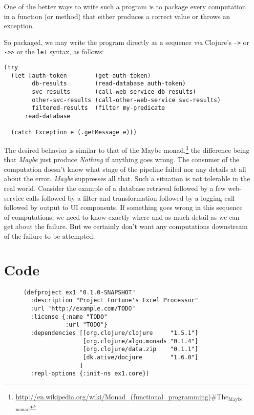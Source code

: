 \documentclass[11pt]{article}
\begin{document}
One of the better ways to write such a program is to package every
computation in a function (or method) that either produces a correct
value or throws an exception.

So packaged, we may write the program
directly as a sequence \emph{via} Clojure's \verb|->| or \verb|->>| or
the \verb|let| syntax, as follows:

\begin{verbatim}
(try
  (let [auth-token        (get-auth-token)
        db-results        (read-database auth-token)
        svc-results       (call-web-service db-results)
        other-svc-results (call-other-web-service svc-results)
        filtered-results  (filter my-predicate 
      read-database

  (catch Exception e (.getMessage e)))
\end{verbatim}

The desired behavior is similar to that of the Maybe
monad,\footnote{\url{http://en.wikipedia.org/wiki/Monad_(functional_programming)}\#The$_{\text{Maybe}}$$_{\text{monad}}$}
the difference being that \emph{Maybe} just produce \emph{Nothing} if anything
goes wrong. The consumer of the computation doesn't know what stage
of the pipeline failed nor any details at all about the error.
\emph{Maybe} suppresses all that. Such a situation is not tolerable in
the real world. Consider the example of a database retrieval
followed by a few web-service calls followed by a filter and
transformation followed by a logging call followed by output to UI
components. If something goes wrong in this sequence of
computations, we need to know exactly where and as much detail as
we can get about the failure. But we certainly don't want any
computations downstream of the failure to be attempted.

\section{Code}
\label{sec-3}

\begin{figure}[H]
\label{project-file}
\begin{verbatim}
(defproject ex1 "0.1.0-SNAPSHOT"
  :description "Project Fortune's Excel Processor"
  :url "http://example.com/TODO"
  :license {:name "TODO"
            :url "TODO"}
  :dependencies [[org.clojure/clojure     "1.5.1"]
                 [org.clojure/algo.monads "0.1.4"]
                 [org.clojure/data.zip    "0.1.1"]
                 [dk.ative/docjure        "1.6.0"]
                ]
  :repl-options {:init-ns ex1.core})
\end{verbatim}
\end{figure}
\end{document}
